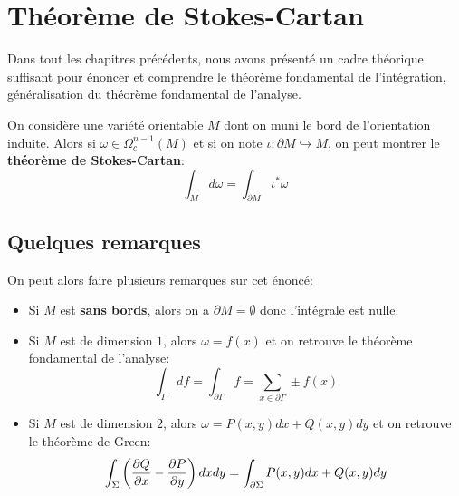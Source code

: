 \chapter{Théorème de Stokes-Cartan}
Dans tout les chapitres précédents, nous avons présenté un cadre théorique suffisant pour énoncer et comprendre le théorème fondamental de l'intégration, généralisation du théorème fondamental de l'analyse.\<

On considère une variété orientable \( M \) dont on muni le bord de l'orientation induite. Alors si \( \omega \in \Omega^{n-1}_c(M)\) et si on note \( \iota : \partial M \hookrightarrow M \), on peut montrer le \textbf{théorème de Stokes-Cartan}:
\[ 
   \int_M d\omega = \int_{\partial M} \iota^*\omega
\]
\section{Quelques remarques}
On peut alors faire plusieurs remarques sur cet énoncé:
\begin{itemize}
   \item Si \( M \) est \textbf{sans bords}, alors on a \( \partial M = \emptyset \) donc l'intégrale est nulle.
   \item Si \( M \) est de dimension \( 1 \), alors \( \omega = f(x) \) et on retrouve le théorème fondamental de l'analyse:
   \[ 
      \int_\Gamma df = \int_{\partial\Gamma} f = \sum_{x \in \partial\Gamma} \pm f(x)
   \]
   \item Si \( M \) est de dimension \( 2 \), alors \( \omega = P(x, y)dx + Q(x, y)dy \) et on retrouve le théorème de Green:
   \[ 
      \int_\Sigma \left(\frac{\partial Q}{\partial x} - \frac{\partial P}{\partial y}\right) dxdy = \int_{\partial \Sigma} P(x, y)dx + Q(x, y)dy
   \]
\end{itemize}
